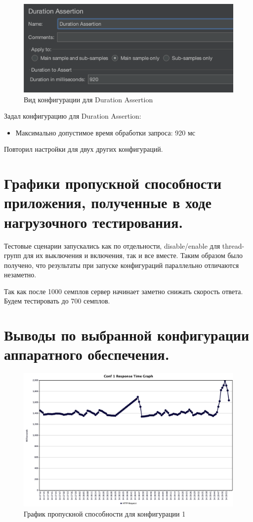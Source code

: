\documentclass[12pt,onecolumn]{article}
\begin{document}
\begin{figure}[H]
  \includegraphics[width=\textwidth]{image/duration-assertion.png}
  \caption{Вид конфигурации для Duration Assertion}
\end{figure}

Задал конфигурацию для Duration Assertion:
\begin{itemize}
  \item[] Максимально допустимое время обработки запроса: 920 мс
\end{itemize}

Повторил настройки для двух других конфигураций.

\section*{Графики пропускной способности приложения, полученные в ходе нагрузочного тестирования.}

Тестовые сценарии запускались как по отдельности, disable/enable для thread-
групп для их выключения и включения, так и все вместе.
Таким образом было получено, что результаты при запуске конфигураций
параллельно отличаются незаметно.

Так как после 1000 семплов сервер начинает заметно снижать скорость ответа.
Будем тестировать до 700 семплов.

\section*{Выводы по выбранной конфигурации аппаратного обеспечения.}

\begin{figure}[H]
  \includegraphics[width=\textwidth]{image/resp-graph-conf-1.png}
  \caption{График пропускной способности для конфигурации 1}
\end{figure}
\end{document}
